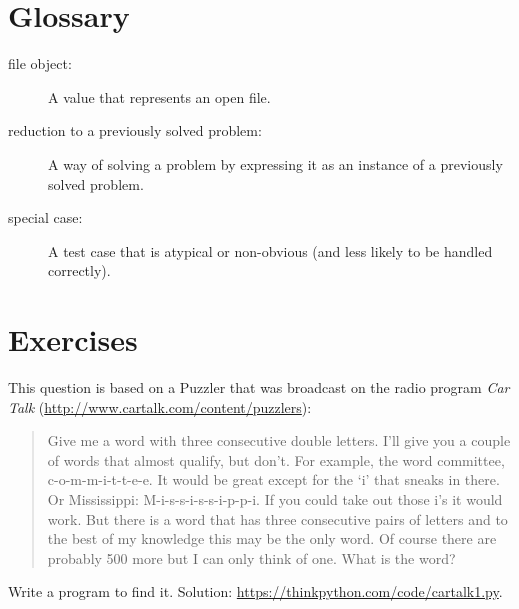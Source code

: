 \documentclass[10pt]{book}
\begin{document}
\section{Glossary}

\begin{description}

\item[file object:] A value that represents an open file.

\item[reduction to a previously solved problem:] A way of solving a
  problem by expressing it as an instance of a previously solved
  problem.  

\item[special case:] A test case that is atypical or non-obvious
(and less likely to be handled correctly).

\end{description}


\section{Exercises}

\begin{exercise}

This question is based on a Puzzler that was broadcast on the radio
program {\em Car Talk}
(\url{http://www.cartalk.com/content/puzzlers}):

\begin{quote}
Give me a word with three consecutive double letters. I'll give you a
couple of words that almost qualify, but don't. For example, the word
committee, c-o-m-m-i-t-t-e-e. It would be great except for the `i' that
sneaks in there. Or Mississippi: M-i-s-s-i-s-s-i-p-p-i. If you could
take out those i's it would work. But there is a word that has three
consecutive pairs of letters and to the best of my knowledge this may
be the only word. Of course there are probably 500 more but I can only
think of one. What is the word?
\end{quote}

Write a program to find it.
Solution: \url{https://thinkpython.com/code/cartalk1.py}.

\end{exercise}
\end{document}
